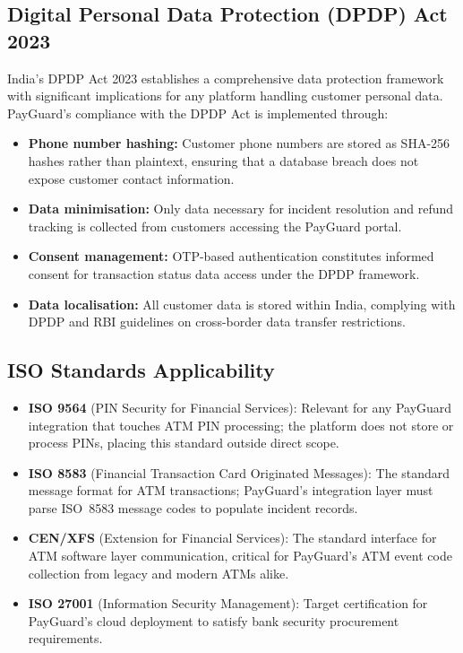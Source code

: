 \documentclass[12pt,a4paper]{article}
\begin{document}
\subsection{Digital Personal Data Protection (DPDP) Act 2023}

India's DPDP Act 2023 \citep{dpdp2023} establishes a comprehensive data protection framework
with significant implications for any platform handling customer personal data. PayGuard's
compliance with the DPDP Act is implemented through:
\begin{itemize}
  \item \textbf{Phone number hashing:} Customer phone numbers are stored as SHA-256 hashes
        rather than plaintext, ensuring that a database breach does not expose customer
        contact information.
  \item \textbf{Data minimisation:} Only data necessary for incident resolution and refund
        tracking is collected from customers accessing the PayGuard portal.
  \item \textbf{Consent management:} OTP-based authentication constitutes informed consent
        for transaction status data access under the DPDP framework.
  \item \textbf{Data localisation:} All customer data is stored within India, complying with
        DPDP and RBI guidelines on cross-border data transfer restrictions.
\end{itemize}

\subsection{ISO Standards Applicability}

\begin{itemize}
  \item \textbf{ISO 9564} (PIN Security for Financial Services): Relevant for any PayGuard
        integration that touches ATM PIN processing; the platform does not store or process
        PINs, placing this standard outside direct scope.
  \item \textbf{ISO 8583} (Financial Transaction Card Originated Messages): The standard
        message format for ATM transactions; PayGuard's integration layer must parse ISO~8583
        message codes to populate incident records.
  \item \textbf{CEN/XFS} \citep{xfs2023} (Extension for Financial Services): The standard
        interface for ATM software layer communication, critical for PayGuard's ATM event code
        collection from legacy and modern ATMs alike.
  \item \textbf{ISO 27001} \citep{iso27001} (Information Security Management): Target
        certification for PayGuard's cloud deployment to satisfy bank security procurement
        requirements.
\end{itemize}
\end{document}
